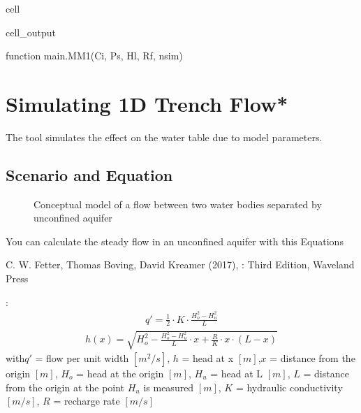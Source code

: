 \documentclass[letterpaper,10pt,english]{jupyterBook}
\begin{document}
\begin{sphinxuseclass}{cell}
\begin{sphinxVerbatimOutput}
\begin{sphinxuseclass}{cell_output}
\begin{sphinxVerbatim}[commandchars=\\\{\}]
\PYGZlt{}function \PYGZus{}\PYGZus{}main\PYGZus{}\PYGZus{}.MM1(C\PYGZus{}i, P\PYGZus{}s, H\PYGZus{}l, R\PYGZus{}f, n\PYGZus{}sim)\PYGZgt{}
\end{sphinxVerbatim}

\end{sphinxuseclass}\end{sphinxVerbatimOutput}

\end{sphinxuseclass}
\sphinxstepscope


\chapter{Simulating 1D Trench Flow*}
\label{\detokenize{content/tools/1D_ditchflow:simulating-1d-trench-flow}}\label{\detokenize{content/tools/1D_ditchflow::doc}}
\sphinxAtStartPar
The tool simulates the effect on the water table due to model parameters.


\section{Scenario and Equation}
\label{\detokenize{content/tools/1D_ditchflow:scenario-and-equation}}
\begin{figure}[htbp]
\centering
\capstart

\noindent{}
\caption{Conceptual model of a flow between two water bodies separated by unconfined aquifer}\label{\detokenize{content/tools/1D_ditchflow:ditch}}\end{figure}

\sphinxAtStartPar
You can calculate the steady flow in an unconfined aquifer with this Equations%
\begin{footnote}[1]\sphinxAtStartFootnote
C. W. Fetter, Thomas Boving, David Kreamer (2017), : Third Edition, Waveland Press
%
\end{footnote} :
\begin{equation*}
\begin{split}q' = \frac{1}{2} \cdot K \cdot \frac{H_o^2-H_u^2}{L}\end{split}
\end{equation*}\begin{equation*}
\begin{split}h(x)=\sqrt{H_o^2 - \frac{H_o^2-H_u^2}{L} \cdot x+\frac{R}{K} \cdot x \cdot(L-x)}\end{split}
\end{equation*}
\sphinxAtStartPar
with\(q'\) = flow per unit width \([m^2/s]\),
\(h\) = head at x \([m]\),\(x\) = distance from the origin \([m]\),
\(H_o\) = head at the origin \([m]\),
\(H_u\) = head at L \([m]\),
\(L\) = distance from the origin at the point \(H_u\) is measured \([m]\),
\(K\) = hydraulic conductivity \([m/s]\),
\(R\) = recharge rate \([m/s]\)
\end{document}
